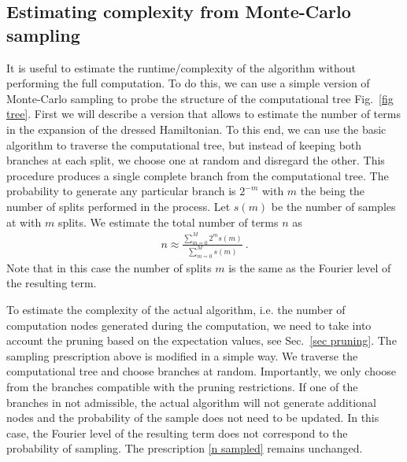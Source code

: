 \documentclass[twocolumn, amsfonts, amssymb, aps, nofootinbib]{revtex4-2}
\begin{document}
\subsection{Estimating complexity from Monte-Carlo sampling} \label{app MC}
It is useful to estimate the runtime/complexity of the algorithm without performing the full computation. To do this, we can use a simple version of Monte-Carlo sampling to probe the structure of the computational tree Fig.~\ref{fig tree}. First we will describe a version that allows to estimate the number of terms in the expansion of the dressed Hamiltonian. To this end, we can use the basic algorithm to traverse the computational tree, but instead of keeping both branches at each split, we choose one at random and disregard the other. This procedure produces a single complete branch from the computational tree. The probability to generate any particular branch is $2^{-m}$ with $m$ the being the number of splits performed in the process. Let $s(m)$ be the number of samples at with $m$ splits. We estimate the total number of terms $n$ as
\begin{align}
	n\approx \frac{\sum_{m=0}^M 2^ms(m)}{\sum_{m=0}^M s(m)} \ . \label{n sampled}
\end{align}
Note that in this case the number of splits $m$ is the same as the Fourier level of the resulting term.

To estimate the complexity of the actual algorithm, i.e. the number of computation nodes generated during the computation, we need to take into account the pruning based on the expectation values, see Sec.~\ref{sec pruning}. The sampling prescription above is modified in a simple way. We traverse the computational tree and choose branches at random. Importantly, we only choose from the branches compatible with the pruning restrictions. If one of the branches in not admissible, the actual algorithm will not generate additional nodes and the probability of the sample does not need to be updated. In this case, the Fourier level of the resulting term does not correspond to the probability of sampling. The prescription \eqref{n sampled} remains unchanged.



\end{document}
